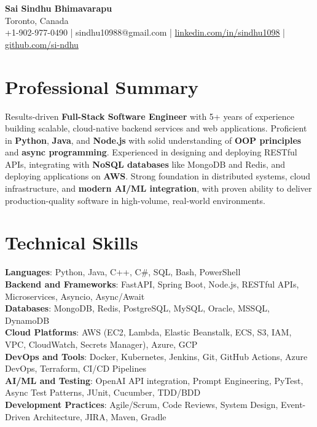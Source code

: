 \documentclass[letterpaper,11pt]{article}
\begin{document}
\begin{center}
  {\Large \textbf{Sai Sindhu Bhimavarapu}} \\
  Toronto, Canada \\
  +1-902-977-0490 \enspace | \enspace sindhu10988@gmail.com \enspace | \enspace \href{https://www.linkedin.com/in/sindhu1098/}{linkedin.com/in/sindhu1098} \enspace | \enspace \href{https://github.com/si-ndhu}{github.com/si-ndhu}
\end{center}

\section{Professional Summary}
  \begin{itemize}[leftmargin=0.15in, label={}]
    \small{\item{
     Results-driven \textbf{Full-Stack Software Engineer} with 5+ years of experience building scalable, cloud-native backend services and web applications. Proficient in \textbf{Python}, \textbf{Java}, and \textbf{Node.js} with solid understanding of \textbf{OOP principles} and \textbf{async programming}. Experienced in designing and deploying RESTful APIs, integrating with \textbf{NoSQL databases} like MongoDB and Redis, and deploying applications on \textbf{AWS}. Strong foundation in distributed systems, cloud infrastructure, and \textbf{modern AI/ML integration}, with proven ability to deliver production-quality software in high-volume, real-world environments.
    }}
  \end{itemize}
\vspace{-16pt}

\section{Technical Skills}
 \begin{itemize}[leftmargin=0.15in, label={}]
    \small{\item{
     \textbf{Languages}: Python, Java, C++, C\#, SQL, Bash, PowerShell \\
     \textbf{Backend and Frameworks}: FastAPI, Spring Boot, Node.js, RESTful APIs, Microservices, Asyncio, Async/Await \\
     \textbf{Databases}: MongoDB, Redis, PostgreSQL, MySQL, Oracle, MSSQL, DynamoDB \\
     \textbf{Cloud Platforms}: AWS (EC2, Lambda, Elastic Beanstalk, ECS, S3, IAM, VPC, CloudWatch, Secrets Manager), Azure, GCP \\
     \textbf{DevOps and Tools}: Docker, Kubernetes, Jenkins, Git, GitHub Actions, Azure DevOps, Terraform, CI/CD Pipelines \\
     \textbf{AI/ML and Testing}: OpenAI API integration, Prompt Engineering, PyTest, Async Test Patterns, JUnit, Cucumber, TDD/BDD \\
     \textbf{Development Practices}: Agile/Scrum, Code Reviews, System Design, Event-Driven Architecture, JIRA, Maven, Gradle
    }}
 \end{itemize}
\vspace{-16pt}
\end{document}

